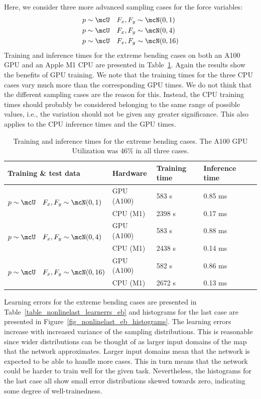 \documentclass[12pt]{article}
\begin{document}
Here, we consider three more advanced sampling cases for the force variables:
\begin{align}
& p \sim \mcU \quad F_x, F_y \sim \mcN(0, 1) \\
& p \sim \mcU \quad F_x, F_y \sim \mcN(0, 4) \\
& p \sim \mcU \quad F_x, F_y \sim \mcN(0, 16) \label{eq_traindata_eb_case3}
\end{align}
Training and inference times for the extreme bending cases on both an A100 GPU and an Apple M1 CPU are presented in Table~\ref{table_nonlinelast_traintimes_eb}. Again the results show the benefits of GPU training. We note that the training times for the three CPU cases vary much more than the corresponding GPU times. We do not think that the different sampling cases are the reason for this. Instead, the CPU training times should probably be considered belonging to the same range of possible values, i.e., the variation should not be given any greater significance. This also applies to the CPU inference times and the GPU times.

\begin{table}[h!]
	\caption{Training and inference times for the extreme bending cases. The A100 GPU Utilization was 46\% in all three cases.}
	\centering
	\begin{tabular}{|l|l|l|l|l|}
		\hline
		 Training \& test data & Hardware & Training time & Inference time \\ \hline
		 \multirow{2}{*}{$p \sim \mcU \quad F_x, F_y \sim \mcN(0, 1)$} & GPU (A100) & 583 s & 0.85 ms \\ \cline{2-4}
		 								       & CPU (M1) & 2398 s & 0.17 ms \\ \hline
		 \multirow{2}{*}{$p \sim \mcU \quad F_x, F_y \sim \mcN(0, 4)$} & GPU (A100) & 583 s & 0.88 ms \\ \cline{2-4}
		 								       & CPU (M1) & 2438 s & 0.14 ms \\ \hline
		 \multirow{2}{*}{$p \sim \mcU \quad F_x, F_y \sim \mcN(0, 16)$} & GPU (A100) & 582 s & 0.86 ms \\ \cline{2-4}
		 								       & CPU (M1) & 2672 s & 0.13 ms \\ \hline
	\end{tabular}\label{table_nonlinelast_traintimes_eb}
\end{table}

Learning errors for the extreme bending cases are presented in Table~\ref{table_nonlinelast_learnerrs_eb} and histograms for the last case are presented in Figure~\ref{fig_nonlinelast_eb_histograms}. The learning errors increase with increased variance of the sampling distributions. This is reasonable since wider distributions can be thought of as larger input domains of the map that the network approximates. Larger input domains mean that the network is expected to be able to handle more cases. This in turn means that the network could be harder to train well for the given task. Nevertheless, the histograms for the last case all show small error distributions skewed towards zero, indicating some degree of well-trainedness.
\end{document}
